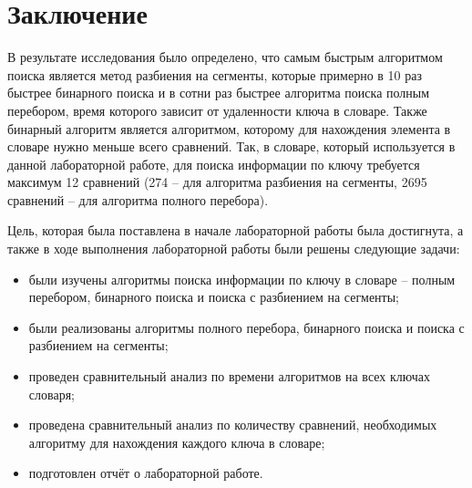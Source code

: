 \chapter*{Заключение}

В результате исследования было определено, что самым быстрым алгоритмом поиска является метод разбиения на сегменты, которые примерно в 10 раз быстрее бинарного поиска и в сотни раз быстрее алгоритма поиска полным перебором, время которого зависит от удаленности ключа в словаре. Также бинарный алгоритм является алгоритмом, которому для нахождения элемента в словаре нужно меньше всего сравнений. Так, в словаре, который используется в данной лабораторной работе, для поиска информации по ключу требуется максимум 12 сравнений (274 -- для алгоритма разбиения на сегменты, 2695 сравнений -- для алгоритма полного перебора).  

Цель, которая была поставлена в начале лабораторной работы была достигнута, а также в ходе выполнения лабораторной работы были решены следующие задачи:

\begin{itemize}
	\item были изучены алгоритмы поиска информации по ключу в словаре -- полным перебором, бинарного поиска и поиска с разбиением на сегменты;
    \item были реализованы алгоритмы полного перебора, бинарного поиска и поиска с разбиением на сегменты;
	\item проведен сравнительный анализ по времени алгоритмов на всех ключах словаря;
	\item проведена сравнительный анализ по количеству сравнений, необходимых алгоритму для нахождения каждого ключа в словаре;
	\item подготовлен отчёт о лабораторной работе.
\end{itemize}
